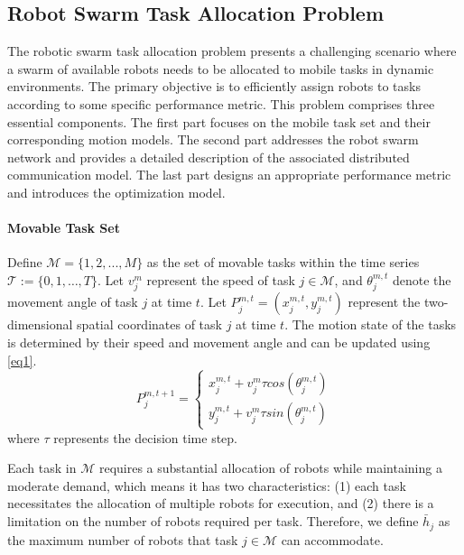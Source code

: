 \documentclass[lettersize,journal]{IEEEtran}
\begin{document}
\subsection{Robot Swarm Task Allocation Problem }\label{subsection2.1}
The robotic swarm task allocation problem  presents a challenging scenario where a swarm of available robots needs to be allocated to mobile tasks in dynamic environments. The primary objective  is to efficiently assign robots to tasks  according to  some specific performance metric. This problem  comprises three essential components. The first part focuses on the mobile task set and their corresponding motion models. The second part addresses the robot swarm network and provides a detailed description of the associated  distributed communication model. The last part designs an appropriate  performance metric and introduces the  optimization model. 

\paragraph{\textbf{Movable Task Set}} Define $\mathcal{M}=\{1,2,...,M\}$ as the set of movable tasks within the time series ${\mathcal{T}}:=\{0,1,\ldots, T\}$. Let $v_j^m$ represent the speed of task $j\in\mathcal{M}$, and $\theta_j^{m,t}$ denote the movement angle of task $j$ at time  $t$. Let $P_j^{m,t}=(x_j^{m,t},y_j^{m,t})$  represent the two-dimensional spatial coordinates of task $j$ at time $t$. The motion state of the tasks is determined by their speed and movement angle and can be updated using \eqref{eq1}.
\begin{equation}
P_j^{m,t+1}=\left\{\begin{matrix}x_j^{m,t}+v_j^m\tau cos(\theta_j^{m,t})\\ y_j^{m,t}+v_j^m\tau sin(\theta_j^{m,t})\end{matrix}\right.\label{eq1}
\end{equation}
where $\tau$ represents the decision time step.

Each task in $\mathcal{M}$ requires a substantial allocation of robots while maintaining a moderate demand, which means it has two characteristics: (1) each task necessitates the allocation of multiple robots for execution, and (2) there is a limitation on the number of robots required per task. Therefore, we define ${\bar{h}}_j$ as the maximum number of robots that task $j\in\mathcal{M}$ can accommodate.
\end{document}
